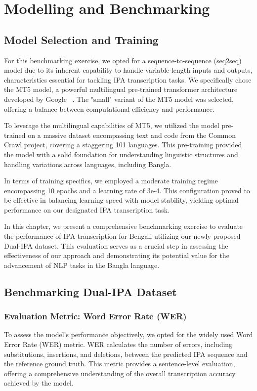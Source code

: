 \chapter{Modelling and Benchmarking}


\section{Model Selection and Training}

For this benchmarking exercise, we opted for a sequence-to-sequence (seq2seq) model due to its inherent capability to handle variable-length inputs and outputs, characteristics essential for tackling IPA transcription tasks. We specifically chose the MT5 model, a powerful multilingual pre-trained transformer architecture developed by Google ~\cite{xue2020mt5}. The "small" variant of the MT5 model was selected, offering a balance between computational efficiency and performance.

To leverage the multilingual capabilities of MT5, we utilized the model pre-trained on a massive dataset encompassing text and code from the Common Crawl project, covering a staggering 101 languages. This pre-training provided the model with a solid foundation for understanding linguistic structures and handling variations across languages, including Bangla.

In terms of training specifics, we employed a moderate training regime encompassing 10 epochs and a learning rate of 3e-4. This configuration proved to be effective in balancing learning speed with model stability, yielding optimal performance on our designated IPA transcription task.



In this chapter, we present a comprehensive benchmarking exercise to evaluate the performance of IPA transcription for Bengali utilizing our newly proposed Dual-IPA dataset. This evaluation serves as a crucial step in assessing the effectiveness of our approach and demonstrating its potential value for the advancement of NLP tasks in the Bangla language.
\newpage
\section{Benchmarking Dual-IPA Dataset}
\subsection{Evaluation Metric: Word Error Rate (WER)}

To assess the model's performance objectively, we opted for the widely used Word Error Rate (WER) metric. WER calculates the number of errors, including substitutions, insertions, and deletions, between the predicted IPA sequence and the reference ground truth. This metric provides a sentence-level evaluation, offering a comprehensive understanding of the overall transcription accuracy achieved by the model.

